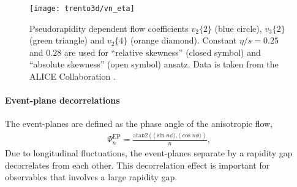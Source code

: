\begin{figure}
\texttt{[image: trento3d/vn\_eta]}
\caption{Pseudorapidity dependent flow coefficients $v_2\{2\}$ (blue circle), $v_3\{2\}$ (green triangle) and $v_2\{4\}$ (orange diamond).
Constant $\eta/s=0.25$ and $0.28$ are used for ``relative skewness'' (closed symbol) and ``absolute skewness'' (open symbol) ansatz. Data is taken from the ALICE Collaboration \cite{Adam:2016ows}.}
\label{fig:trento:vn_eta}
\end{figure}

\paragraph{Event-plane decorrelations} The event-planes are defined as the phase angle of the anisotropic flow,
\begin{eqnarray}
\Psi_n^\text{EP} = \frac{\text{atan2}(\langle \sin n \phi \rangle, \langle\cos n \phi \rangle)}{n},
\end{eqnarray}
Due to longitudinal fluctuations, the event-planes separate by a rapidity gap decorrelates from each other.
This decorrelation effect is important for observables that involves a large rapidity gap.

